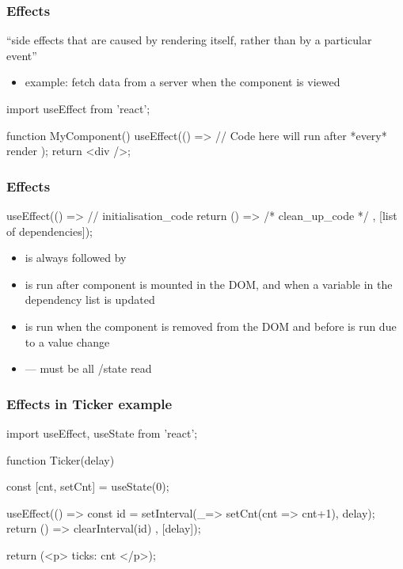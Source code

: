 \begin{frame}[fragile] \frametitle{Effects}
``side effects that are caused by rendering itself, rather than by a particular event''
\begin{itemize}
  \item example: fetch data from a server when the component is viewed
\end{itemize}
\vspace{5mm}
\begin{CodeBox}{}
import { useEffect } from 'react';

function MyComponent() {
  useEffect(() => {
    // Code here will run after *every* render
  });
  return <div />;
}
\end{CodeBox}
\end{frame}

\begin{frame}[fragile] \frametitle{Effects}
\begin{CodeBox}{}
useEffect(() => {
  // initialisation_code
  return 
    () => {/* clean_up_code */}
  }, [list of dependencies]);
\end{CodeBox}
\vspace{5mm}
\begin{itemize}
  \item {} is always followed by 
  \item {} is run after component is mounted in the DOM, and when a variable in the dependency list is updated
  \item {} is run when the component is removed from the DOM and before  is run due to a value change
  \item {} --- must be all /state read
\end{itemize}
\end{frame}

\begin{frame}[fragile] \frametitle{Effects in Ticker example}
\begin{CodeBox}{}
import { useEffect, useState } from 'react';

function Ticker({delay}) {
  const [cnt, setCnt] = useState(0);
  
  useEffect(() => {
    const id = setInterval(_=> setCnt(cnt => cnt+1), delay);
    return () => {clearInterval(id)}
  }, [delay]);
  
  return (<p> ticks: {cnt} </p>);
}
\end{CodeBox}
\end{frame}

